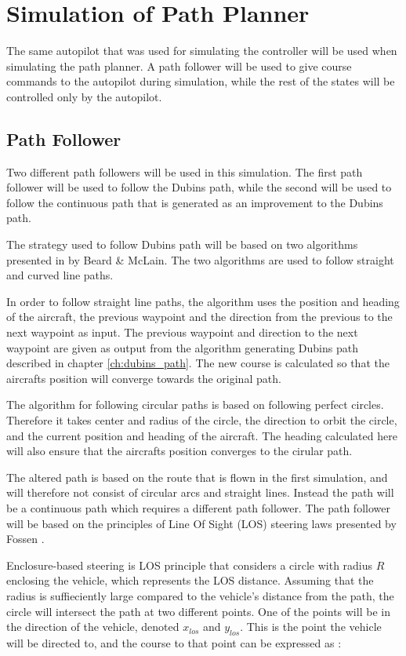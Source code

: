 \section{Simulation of Path Planner}

The same autopilot that was used for simulating the controller will be used when simulating the path planner. A path follower will be used to give course commands to the autopilot during simulation, while the rest of the states will be controlled only by the autopilot.


\subsection{Path Follower}
\label{ch:path_follower}

Two different path followers will be used in this simulation. The first path follower will be used to follow the Dubins path, while the second will be used to follow the continuous path that is generated as an improvement to the Dubins path.

The strategy used to follow Dubins path will be based on two algorithms presented in \cite{suaBEARD} by Beard \& McLain. The two algorithms are used to follow straight and curved line paths.

In order to follow straight line paths, the algorithm uses the position and heading of the aircraft, the previous waypoint and the direction from the previous to the next waypoint as input. The previous waypoint and direction to the next waypoint are given as output from the algorithm generating Dubins path described in chapter \ref{ch:dubins_path}. The new course is calculated so that the aircrafts position will converge towards the original path.

The algorithm for following circular paths is based on following perfect circles. Therefore it takes center and radius of the circle, the direction to orbit the circle, and the current position and heading of the aircraft. The heading calculated here will also ensure that the aircrafts position converges to the cirular path.

The altered path is based on the route that is flown in the first simulation, and will therefore not consist of circular arcs and straight lines. Instead the path will be a continuous path which requires a different path follower. The path follower will be based on the principles of Line Of Sight (LOS) steering laws presented by Fossen \cite{fartoyFOSSEN}.

Enclosure-based steering is LOS principle that considers a circle with radius $R$ enclosing the vehicle, which represents the LOS distance. Assuming that the radius is suffieciently large compared to the vehicle's distance from the path, the circle will intersect the path at two different points. One of the points will be in the direction of the vehicle, denoted $x_{los}$ and $y_{los}$. This is the point the vehicle will be directed to, and the course to that point can be expressed as \cite{fartoyFOSSEN}:

